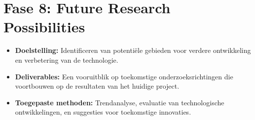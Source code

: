 \section{Fase 8: Future Research Possibilities}
\begin{itemize}
\item \textbf{Doelstelling:} Identificeren van potentiële gebieden voor verdere ontwikkeling en verbetering van de technologie.
\item \textbf{Deliverables:} Een vooruitblik op toekomstige onderzoeksrichtingen die voortbouwen op de resultaten van het huidige project.
\item \textbf{Toegepaste methoden:} Trendanalyse, evaluatie van technologische ontwikkelingen, en suggesties voor toekomstige innovaties.
\end{itemize}
